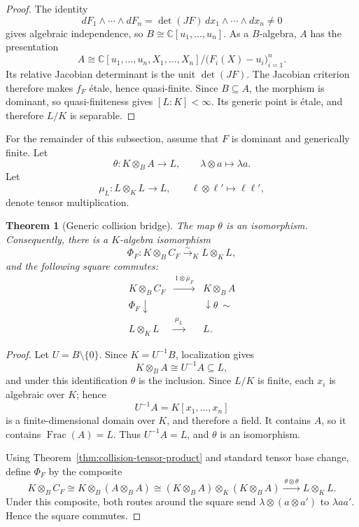 \documentclass[11pt]{article}
\newtheorem{theorem}{Theorem}[section]
\theoremstyle{remark}
\DeclareMathOperator{\Frac}{Frac}
\newcommand{\C}{\mathbb C}
\begin{document}
\begin{proof}
The identity
\[
  dF_1\wedge\cdots\wedge dF_n
  =\det(JF)\,dx_1\wedge\cdots\wedge dx_n\neq0
\]
gives algebraic independence, so
\(B\cong\C[u_1,\dots,u_n]\).  As a \(B\)-algebra, \(A\) has the
presentation
\[
  A\cong
  \C[u_1,\dots,u_n,X_1,\dots,X_n]
  \big/\bigl(F_i(X)-u_i\bigr)_{i=1}^n.
\]
Its relative Jacobian determinant is the unit \(\det(JF)\).  The Jacobian
criterion therefore makes \(f_F\) \'etale, hence quasi-finite.  Since
\(B\subseteq A\), the morphism is dominant, so quasi-finiteness gives
\([L:K]<\infty\).  Its generic point is \'etale, and therefore \(L/K\) is
separable.
\end{proof}

For the remainder of this subsection, assume that \(F\) is dominant and
generically finite.  Let
\[
  \theta\colon K\otimes_BA\longrightarrow L,
  \qquad
  \lambda\otimes a\longmapsto\lambda a.
\]
Let
\[
  \mu_L\colon L\otimes_KL\longrightarrow L,
  \qquad
  \ell\otimes\ell'\longmapsto\ell\ell',
\]
denote tensor multiplication.

\begin{theorem}[Generic collision bridge]
\label{thm:generic-collision-base-change}
The map \(\theta\) is an isomorphism.  Consequently, there is a
\(K\)-algebra isomorphism
\[
  \Phi_F\colon K\otimes_BC_F
  \xrightarrow{\sim}_K
  L\otimes_KL,
\]
and the following square commutes:
\[
  \begin{array}{ccc}
    K\otimes_BC_F
      &\xrightarrow{\ 1\otimes\bar\mu_F\ }&
    K\otimes_BA\\
    {\scriptstyle\Phi_F}\downarrow
      &&\downarrow{\scriptstyle\theta\ \sim}\\
    L\otimes_KL
      &\xrightarrow{\ \mu_L\ }&
    L.
  \end{array}
\]
\end{theorem}

\begin{proof}
Let \(U=B\setminus\{0\}\).  Since \(K=U^{-1}B\), localization gives
\[
  K\otimes_BA\cong U^{-1}A\subseteq L,
\]
and under this identification \(\theta\) is the inclusion.  Since \(L/K\)
is finite, each \(x_i\) is algebraic over \(K\); hence
\[
  U^{-1}A=K[x_1,\dots,x_n]
\]
is a finite-dimensional domain over \(K\), and therefore a field.  It
contains \(A\), so it contains \(\Frac(A)=L\).  Thus \(U^{-1}A=L\), and
\(\theta\) is an isomorphism.

Using Theorem~\ref{thm:collision-tensor-product} and standard tensor base
change, define \(\Phi_F\) by the composite
\[
  K\otimes_BC_F
  \cong
  K\otimes_B(A\otimes_BA)
  \cong
  (K\otimes_BA)\otimes_K(K\otimes_BA)
  \xrightarrow{\ \theta\otimes\theta\ }
  L\otimes_KL.
\]
Under this composite, both routes around the square send
\(\lambda\otimes(a\otimes a')\) to \(\lambda aa'\).  Hence the square
commutes.
\end{proof}
\end{document}
